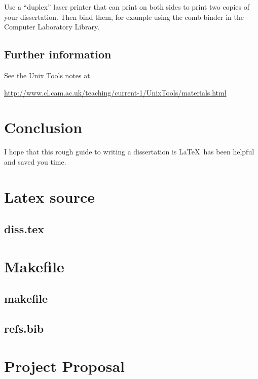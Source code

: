 \documentclass[12pt,a4paper,twoside,openright]{report}
\begin{document}
Use a ``duplex'' laser printer that can print on both sides to print
two copies of your dissertation. Then bind them, for example using the
comb binder in the Computer Laboratory Library.

\section{Further information}

See the Unix Tools notes at

\url{http://www.cl.cam.ac.uk/teaching/current-1/UnixTools/materials.html}


\chapter{Conclusion}

I hope that this rough guide to writing a dissertation is \LaTeX\ has
been helpful and saved you time.




\appendix


\chapter{Latex source}

\section{diss.tex}
{\scriptsize}

\chapter{Makefile}

\section{makefile}\label{makefile}
{\scriptsize}

\section{refs.bib}
{\scriptsize}


\chapter{Project Proposal}


\end{document}
